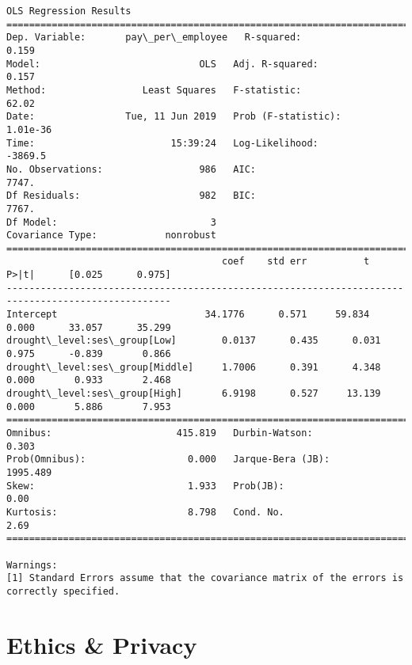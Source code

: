 \documentclass[11pt]{article}
\begin{document}
    \begin{Verbatim}[commandchars=\\\{\}]
                            OLS Regression Results                            
==============================================================================
Dep. Variable:       pay\_per\_employee   R-squared:                       0.159
Model:                            OLS   Adj. R-squared:                  0.157
Method:                 Least Squares   F-statistic:                     62.02
Date:                Tue, 11 Jun 2019   Prob (F-statistic):           1.01e-36
Time:                        15:39:24   Log-Likelihood:                -3869.5
No. Observations:                 986   AIC:                             7747.
Df Residuals:                     982   BIC:                             7767.
Df Model:                           3                                         
Covariance Type:            nonrobust                                         
===================================================================================================
                                      coef    std err          t      P>|t|      [0.025      0.975]
---------------------------------------------------------------------------------------------------
Intercept                          34.1776      0.571     59.834      0.000      33.057      35.299
drought\_level:ses\_group[Low]        0.0137      0.435      0.031      0.975      -0.839       0.866
drought\_level:ses\_group[Middle]     1.7006      0.391      4.348      0.000       0.933       2.468
drought\_level:ses\_group[High]       6.9198      0.527     13.139      0.000       5.886       7.953
==============================================================================
Omnibus:                      415.819   Durbin-Watson:                   0.303
Prob(Omnibus):                  0.000   Jarque-Bera (JB):             1995.489
Skew:                           1.933   Prob(JB):                         0.00
Kurtosis:                       8.798   Cond. No.                         2.69
==============================================================================

Warnings:
[1] Standard Errors assume that the covariance matrix of the errors is correctly specified.

    \end{Verbatim}

    \hypertarget{ethics-privacy}{%
\section{Ethics \& Privacy}\label{ethics-privacy}}
\end{document}
